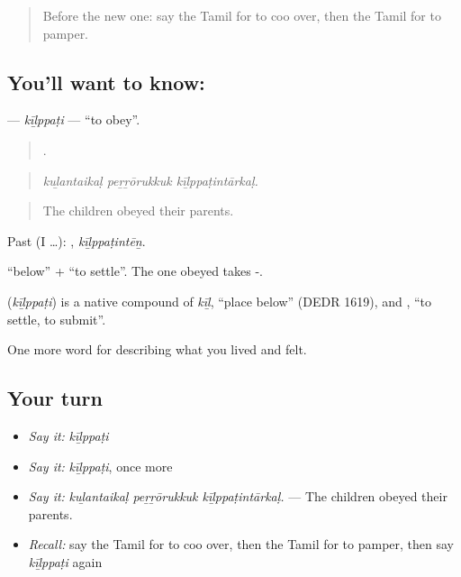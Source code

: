 \label{lesson:TA-C497-kilppati}



\begin{quote}
Before the new one: say the Tamil for to coo over, then the Tamil for to pamper.
\end{quote}

\subsection*{You'll want to know: }
\textbf{} — \emph{kīḻppaṭi} — \textquotedblleft{}to obey\textquotedblright{}.

\begin{quote}
  .
\end{quote}

\begin{quote}
\emph{kuḻantaikaḷ peṟṟōrukkuk kīḻppaṭintārkaḷ.}
\end{quote}

\begin{quote}
The children obeyed their parents.
\end{quote}

Past (I …): , \emph{kīḻppaṭintēṉ}.

 \textquotedblleft{}below\textquotedblright{} +  \textquotedblleft{}to settle\textquotedblright{}. The one obeyed takes -.

\begin{cousinweb}
\textbf{} (\emph{kīḻppaṭi}) is a native compound of  \emph{kīḻ}, \textquotedblleft{}place below\textquotedblright{} (DEDR 1619), and , \textquotedblleft{}to settle, to submit\textquotedblright{}.
\end{cousinweb}

\begin{grammarlens}[title={What you've built}]
One more word for describing what you lived and felt.
\end{grammarlens}

\subsection*{Your turn}
\begin{itemize}
\raggedright
  \item \emph{Say it:} \emph{kīḻppaṭi}
  \item \emph{Say it:} \emph{kīḻppaṭi}, once more
  \item \emph{Say it:} \emph{kuḻantaikaḷ peṟṟōrukkuk kīḻppaṭintārkaḷ.} — The children obeyed their parents.
  \item \emph{Recall:} say the Tamil for to coo over, then the Tamil for to pamper, then say \emph{kīḻppaṭi} again
\end{itemize}

